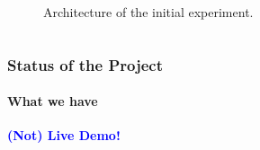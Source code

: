 \documentclass[9pt,    %
    english,            %
    xcolor=table,       %
    envcountsect,        %
    aspectratio=169     %
]{beamer}
\begin{document}
\begin{frame}
\begin{columns}[t]
\begin{column}{.3\textwidth}
\begin{figure}[t!]
                \caption{Architecture of the initial experiment.\label{fig:architecture}}
            \end{figure}
        \end{column}
    \end{columns}
\end{frame}

\begin{frame}
    \frametitle{Status of the Project}
    \framesubtitle{What we have}
    
    \textbf{\textcolor{blue}{(Not) Live Demo!}}
    \begin{center}
    \end{center}
\end{frame}
\end{document}
